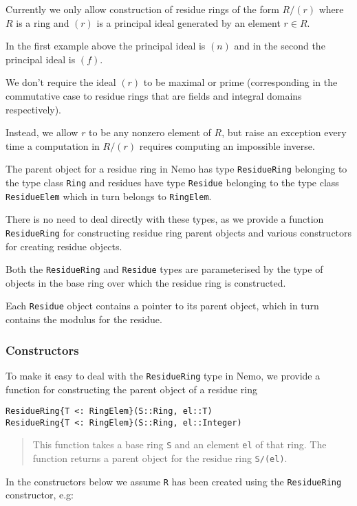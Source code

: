 \documentclass[a4paper,10pt]{article}
\newcommand{\code}{\lstinline}
\newcommand{\desc}[1]{\vspace{-3mm}\begin{quote}#1\end{quote}}
\begin{document}
Currently we only allow construction of residue rings of the form $R/(r)$ where
$R$ is a ring and $(r)$ is a principal ideal generated by an element $r \in R$. 

In the first example above the principal ideal is $(n)$ and in the second the principal
ideal is $(f)$.

We don't require the ideal $(r)$ to be maximal or prime (corresponding in the
commutative case to residue rings that are fields and integral domains 
respectively). 

Instead, we allow $r$ to be any nonzero element of $R$, but raise an exception
every time a computation in $R/(r)$ requires computing an impossible inverse.

The parent object for a residue ring in Nemo has type \code{ResidueRing} belonging
to the type class \code{Ring} and residues have type \code{Residue} belonging to
the type class \code{ResidueElem} which in turn belongs to \code{RingElem}. 

There is no need to deal directly with these types, as we provide a function
\code{ResidueRing} for constructing residue ring parent objects and various
constructors for creating residue objects.

Both the \code{ResidueRing} and \code{Residue} types are parameterised by the
type of objects in the base ring over which the residue ring is constructed.

Each \code{Residue} object contains a pointer to its parent object, which in
turn contains the modulus for the residue.

\subsubsection{Constructors}

To make it easy to deal with the \code{ResidueRing} type in Nemo, we provide a
function for constructing the parent object of a residue ring

\begin{lstlisting}
ResidueRing{T <: RingElem}(S::Ring, el::T)
ResidueRing{T <: RingElem}(S::Ring, el::Integer)
\end{lstlisting}

\desc{This function takes a base ring \code{S} and an element \code{el} of that
ring. The function returns a parent object for the residue ring \code{S/(el)}.}

In the constructors below we assume \code{R} has been created using the 
\code{ResidueRing} constructor, e.g:
\end{document}
